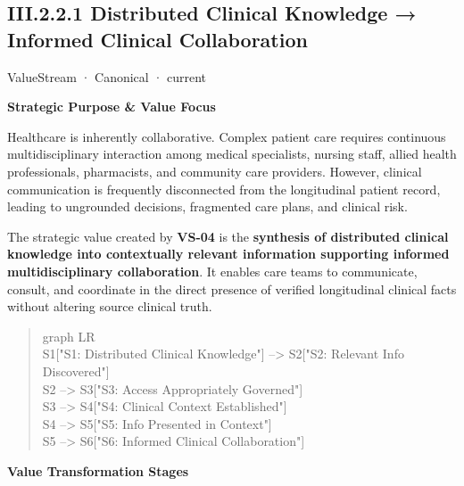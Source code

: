 \subsection*{III.2.2.1 Distributed Clinical Knowledge → Informed Clinical Collaboration}
\label{navigation:III.2.2.1}

\label{element:3ba98c0c1170458f8c02fa76694fee67}
{\small ValueStream · Canonical · current}\par

\par\medskip\textbf{Strategic Purpose \& Value Focus}\par


Healthcare is inherently collaborative. Complex patient care requires continuous multidisciplinary interaction among medical specialists, nursing staff, allied health professionals, pharmacists, and community care providers. However, clinical communication is frequently disconnected from the longitudinal patient record, leading to ungrounded decisions, fragmented care plans, and clinical risk.



The strategic value created by \textbf{VS-04} is the \textbf{synthesis of distributed clinical knowledge into contextually relevant information supporting informed multidisciplinary collaboration}. It enables care teams to communicate, consult, and coordinate in the direct presence of verified longitudinal clinical facts without altering source clinical truth.



\begin{quote}\small\ttfamily
graph LR\\
    S1["S1: Distributed Clinical Knowledge"] --> S2["S2: Relevant Info Discovered"]\\
    S2 --> S3["S3: Access Appropriately Governed"]\\
    S3 --> S4["S4: Clinical Context Established"]\\
    S4 --> S5["S5: Info Presented in Context"]\\
    S5 --> S6["S6: Informed Clinical Collaboration"]\\

\end{quote}


\par\medskip\textbf{Value Transformation Stages}\par


